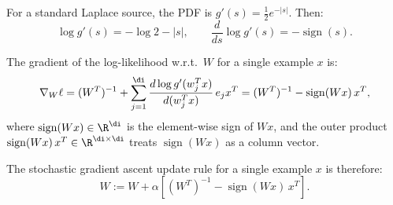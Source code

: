 \begin{answer}
For a standard Laplace source, the PDF is $g'(s) = \frac{1}{2}e^{-|s|}$. Then:
$$\log g'(s) = -\log 2 - |s|, \qquad \frac{d}{ds}\log g'(s) = -\operatorname{sign}(s).$$

The gradient of the log-likelihood w.r.t.\ $W$ for a single example $x$ is:
$$\nabla_W \ell = (W^T)^{-1} + \sum_{j=1}^\di \frac{d\log g'(w_j^Tx)}{d(w_j^Tx)}\, e_j x^T = (W^T)^{-1} - \operatorname{sign}(Wx)\,x^T,$$
where $\operatorname{sign}(Wx) \in \R^\di$ is the element-wise sign of $Wx$, and the outer product $\operatorname{sign}(Wx)\,x^T \in \R^{\di\times\di}$ treats $\operatorname{sign}(Wx)$ as a column vector.

The stochastic gradient ascent update rule for a single example $x$ is therefore:
$$\boxed{W := W + \alpha\left[(W^T)^{-1} - \operatorname{sign}(Wx)\,x^T\right].}$$
\end{answer}
